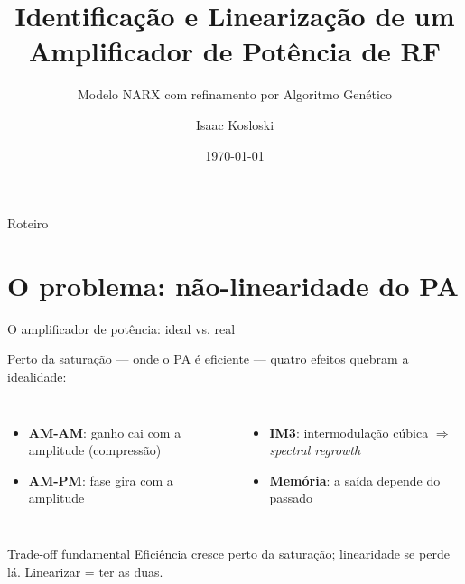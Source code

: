 \documentclass[10pt,aspectratio=169]{beamer}
\title{Identificação e Linearização de um Amplificador de Potência de RF}
\subtitle{Modelo NARX com refinamento por Algoritmo Genético}
\author{Isaac Kosloski}
\institute{Grupo de Pesquisa --- Mestrado}
\date{\today}
\begin{document}
\maketitle

\begin{frame}{Roteiro}
  \tableofcontents
\end{frame}

\section{O problema: não-linearidade do PA}
\begin{frame}{O amplificador de potência: ideal vs. real}
  \begin{center}
  \end{center}
  \vspace{0.3cm}
  Perto da saturação --- onde o PA é \alert{eficiente} --- quatro efeitos quebram a idealidade:
  \begin{columns}[T]
    \begin{itemize}\setlength\itemsep{2pt}
      \item \textbf{AM-AM}: ganho cai com a amplitude (compressão)
      \item \textbf{AM-PM}: fase gira com a amplitude
    \end{itemize}
    \begin{itemize}\setlength\itemsep{2pt}
      \item \textbf{IM3}: intermodulação cúbica $\Rightarrow$ \emph{spectral regrowth}
      \item \textbf{Memória}: a saída depende do passado
    \end{itemize}
  \end{columns}
  \vspace{0.2cm}
  \begin{alertblock}{\footnotesize Trade-off fundamental}
    \footnotesize Eficiência cresce perto da saturação; linearidade se perde lá. Linearizar = ter as duas.
  \end{alertblock}
\end{frame}
\end{document}
